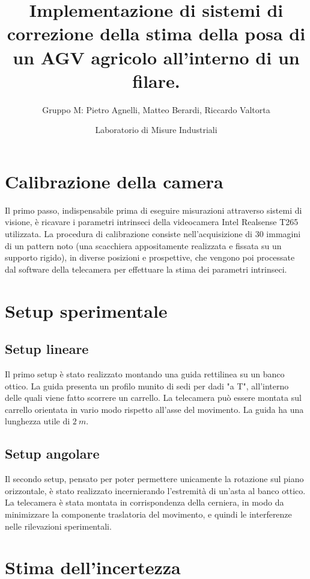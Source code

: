 \documentclass[
	a4paper, %
	10pt, %
]{LTJournalArticle}
\title{Implementazione di sistemi di correzione della stima della posa di un AGV agricolo all'interno di un filare.} %
\author{
	Gruppo M: Pietro Agnelli, Matteo Berardi, Riccardo Valtorta \hfill \fontsize{9pt}{12pt}\selectfont\\
}
\date{
         Laboratorio di Misure Industriali %
}
\begin{document}
\maketitle %


\section{Calibrazione della camera}

Il primo passo, indispensabile prima di eseguire misurazioni attraverso sistemi di visione, è ricavare i parametri intrinseci della videocamera Intel Realsense T265 utilizzata. La procedura di calibrazione consiste nell'acquisizione di $30$ immagini di un pattern noto (una scacchiera appositamente realizzata e fissata su un supporto rigido), in diverse posizioni e prospettive, che vengono poi processate dal software della telecamera per effettuare la stima dei parametri intrinseci. 

\section{Setup sperimentale}
\subsection{Setup lineare}
Il primo setup è stato realizzato montando una guida rettilinea su un banco ottico. La guida presenta un profilo munito di sedi per dadi "a T", all'interno delle quali viene fatto scorrere un carrello. La telecamera può essere montata sul carrello orientata in vario modo rispetto all'asse del movimento. La guida ha una lunghezza utile di $2\ m$.
\subsection{Setup angolare}
Il secondo setup, pensato per poter permettere unicamente la rotazione sul piano orizzontale, è stato realizzato incernierando l'estremità di un'asta al banco ottico. La telecamera è stata montata in corrispondenza della cerniera, in modo da minimizzare la componente traslatoria del movimento, e quindi le interferenze nelle rilevazioni sperimentali.

\section{Stima dell'incertezza}
\end{document}
